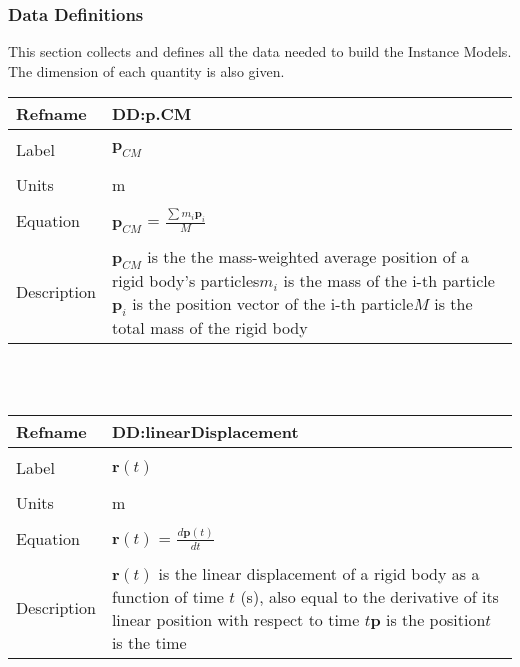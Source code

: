 \documentclass[12pt]{article}
\begin{document}
\subsubsection{Data Definitions}
\label{Sec:DataDefi}
This section collects and defines all the data needed to build the Instance Models. The dimension of each quantity is also given.
~\newline
\noindent \begin{minipage}{\textwidth}
\begin{tabular}{p{} p{}}
\toprule \textbf{Refname} & \textbf{DD:p.CM}
\label{DD:p.CM}
\\ \midrule \\
Label & $\mathbf{p}_{CM}$
\\ \midrule \\
Units & m
\\ \midrule \\
Equation & $\mathbf{p}_{CM}$ = $\frac{\sum{m_{i}\mathbf{p}_{i}}}{M}$
\\ \midrule \\
Description & $\mathbf{p}_{CM}$ is the the mass-weighted average position of a rigid body's particles\newline$m_{i}$ is the mass of the i-th particle\newline$\mathbf{p}_{i}$ is the position vector of the i-th particle\newline$M$ is the total mass of the rigid body
\\ \bottomrule \end{tabular}
\end{minipage}\\
~\newline
\noindent \begin{minipage}{\textwidth}
\begin{tabular}{p{} p{}}
\toprule \textbf{Refname} & \textbf{DD:linearDisplacement}
\label{DD:linearDisplacement}
\\ \midrule \\
Label & $\mathbf{r}(t)$
\\ \midrule \\
Units & m
\\ \midrule \\
Equation & $\mathbf{r}(t)$ = $\frac{d\mathbf{p}(t)}{dt}$
\\ \midrule \\
Description & $\mathbf{r}(t)$ is the linear displacement of a rigid body as a function of time $t$ (s), also equal to the derivative of its linear position with respect to time $t$\newline$\mathbf{p}$ is the position\newline$t$ is the time
\\ \bottomrule \end{tabular}
\end{minipage}\\
\end{document}
